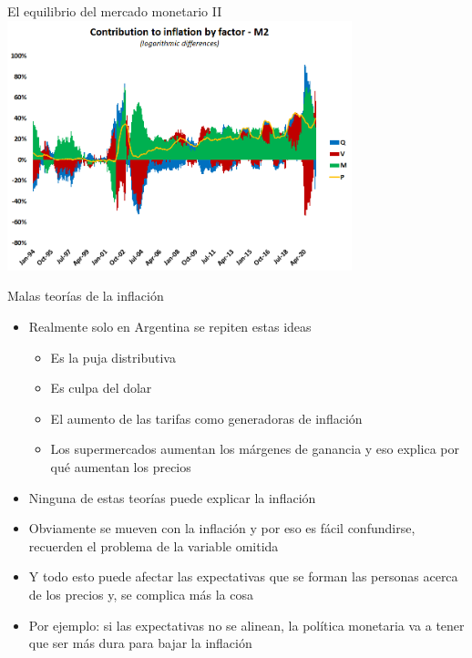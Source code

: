 \documentclass{beamer}
\begin{document}
\begin{frame}{El equilibrio del mercado monetario II}
\centering\includegraphics[width=10cm]{Figures/inflation contribution by factor.png}\
\end{frame}

\begin{frame}{Malas teorías de la inflación}
    \begin{itemize}
        \item Realmente solo en Argentina se repiten estas ideas
            \begin{itemize}
        \item Es la puja distributiva
        \item Es culpa del dolar
        \item El aumento de las tarifas como generadoras de inflación
        \item Los supermercados aumentan los márgenes de ganancia y eso explica por qué aumentan los precios
            \end{itemize}
        \item Ninguna de estas teorías puede explicar la inflación
        \item Obviamente se mueven con la inflación y por eso es fácil confundirse, recuerden el problema de la variable omitida
        \item Y todo esto puede afectar las expectativas que se forman las personas acerca de los precios y, se complica más la cosa
        \item Por ejemplo: si las expectativas no se alinean, la política monetaria va a tener que ser más dura para bajar la inflación
    \end{itemize}
\end{frame}
\end{document}
